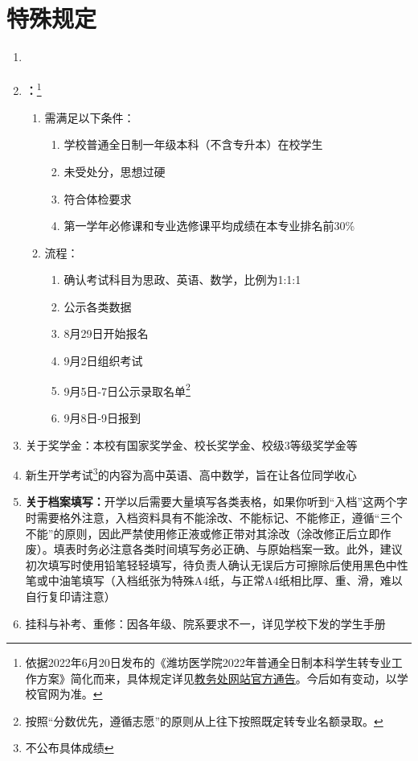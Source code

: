 \section[特殊规定]{特殊规定}
\begin{enumerate}
    \item \textbf{}
    \item \textbf{：}\footnote{依据2022年6月20日发布的《潍坊医学院2022年普通全日制本科学生转专业工作方案》简化而来，具体规定详见\uline{\href{https://jwch.wfmc.edu.cn/2022/0620/c2593a105784/page.htm}{教务处网站官方通告}}。今后如有变动，以学校官网为准。}
          \begin{enumerate}
              \item 需满足以下条件：
                    \begin{enumerate}
                        \item 学校普通全日制一年级本科（不含专升本）在校学生
                        \item 未受处分，思想过硬
                        \item 符合体检要求
                        \item 第一学年必修课和专业选修课平均成绩在本专业排名前30\%
                    \end{enumerate}
              \item 流程：
                    \begin{enumerate}
                        \item 确认考试科目为思政、英语、数学，比例为1:1:1
                        \item 公示各类数据
                        \item 8月29日开始报名
                        \item 9月2日组织考试
                        \item 9月5日-7日公示录取名单\footnote{按照“分数优先，遵循志愿”的原则从上往下按照既定转专业名额录取。}
                        \item 9月8日-9日报到
                    \end{enumerate}
          \end{enumerate}
    \item 关于奖学金：本校有国家奖学金、校长奖学金、校级3等级奖学金等
    \item 新生开学考试\footnote{不公布具体成绩}的内容为高中英语、高中数学，旨在让各位同学收心
    \item \textbf{关于档案填写：}开学以后需要大量填写各类表格，如果你听到“入档”这两个字时需要格外注意，入档资料具有不能涂改、不能标记、不能修正，遵循“三个不能”的原则，因此严禁使用修正液或修正带对其涂改（涂改修正后立即作废）。填表时务必注意各类时间填写务必正确、与原始档案一致。此外，建议初次填写时使用铅笔轻轻填写，待负责人确认无误后方可擦除后使用黑色中性笔或中油笔填写（入档纸张为特殊A4纸，与正常A4纸相比厚、重、滑，难以自行复印请注意）
    \item 挂科与补考、重修：因各年级、院系要求不一，详见学校下发的学生手册
\end{enumerate}